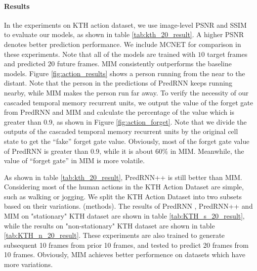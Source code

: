 \documentclass[10pt,twocolumn,letterpaper]{article}
\begin{document}
\paragraph{Results} In the experiments on KTH action dataset, we use image-level PSNR and SSIM to evaluate our models, as shown in table \ref{tab:kth_20_result}. A higher PSNR denotes better prediction performance. We include MCNET \citep{Villegas2017Decomposing} for comparison in these experiments. Note that all of the models are trained with $10$ target frames and predicted $20$ future frames. MIM consistently outperforms the baseline models. Figure \ref{fig:action_results} shows a person running from the near to the distant. Note that the person in the predictions of PredRNN keeps running nearby, while MIM makes the person run far away. To verify the necessity of our cascaded temporal memory recurrent units, we output the value of the forget gate from PredRNN and MIM and calculate the percentage of the value which is greater than 0.9, as shown in Figure \ref{fig:action_forget}. Note that we divide the outputs of the cascaded temporal memory recurrent units by the original cell state to get the ``fake'' forget gate value. Obviously, most of the forget gate value of PredRNN is greater than 0.9, while it is about $60\%$ in MIM. Meanwhile, the value of ``forget gate'' in MIM is more volatile.

As shown in table \ref{tab:kth_20_result}, PredRNN++ \citep{wang2018predrnn++} is still better than MIM. Considering most of the human actions in the KTH Action Dataset are simple, such as walking or jogging. We split the KTH Action Dataset into two subsets based on their variations. (methods). The results of PredRNN \citep{wang2017predrnn}, PredRNN++ \citep{wang2018predrnn++} and MIM on "stationary" KTH dataset are shown in table \ref{tab:KTH_s_20_result}, while the results on "non-stationary" KTH dataset are shown in table \ref{tab:KTH_n_20_result}. These experiments are also trained to generate subsequent 10 frames from prior 10 frames, and tested to predict 20 frames from 10 frames. Obviously, MIM achieves better performence on datasets which have more variations.
\end{document}
